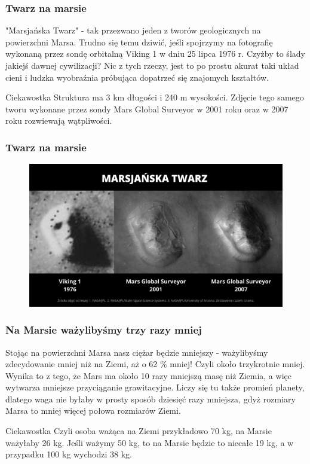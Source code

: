 \documentclass{beamer}
\begin{document}
\begin{frame}
\frametitle{Twarz na marsie}
"Marsjańska Twarz" - tak przezwano jeden z tworów geologicznych na powierzchni Marsa. Trudno się temu dziwić, jeśli spojrzymy na fotografię wykonaną przez sondę orbitalną Viking 1 w dniu 25 lipca 1976 r. Czyżby to ślady jakiejś dawnej cywilizacji? Nic z tych rzeczy, jest to po prostu akurat taki układ cieni i ludzka wyobraźnia próbująca dopatrzeć się znajomych kształtów.

 
\begin{block}{Ciekawostka}
Struktura ma 3 km długości i 240 m wysokości. Zdjęcie tego samego tworu wykonane przez sondy Mars Global Surveyor w 2001 roku oraz w 2007 roku rozwiewają wątpliwości. 
\end{block}
\end{frame}

\begin{frame}
\frametitle{Twarz na marsie}
\begin{figure}[h]
\centering
\includegraphics[width=1\textwidth]{twarz.png}
\end{figure}
\end{frame}

\begin{frame}
\frametitle{Na Marsie ważylibyśmy trzy razy mniej}
Stojąc na powierzchni Marsa nasz ciężar będzie mniejszy - ważylibyśmy zdecydowanie mniej niż na Ziemi, aż o 62 \% mniej! Czyli około trzykrotnie mniej. Wynika to z tego, że Mars ma około 10 razy mniejszą masę niż Ziemia, a więc wytwarza mniejsze przyciąganie grawitacyjne. Liczy się tu także promień planety, dlatego waga nie byłaby w prosty sposób dziesięć razy mniejsza, gdyż rozmiary Marsa to mniej więcej połowa rozmiarów Ziemi.

\begin{block}{Ciekawostka}
Czyli osoba ważąca na Ziemi przykładowo 70 kg, na Marsie ważyłaby 26 kg. Jeśli ważymy 50 kg, to na Marsie będzie to niecałe 19 kg, a w przypadku 100 kg wychodzi 38 kg.
\end{block}
\end{frame}
\end{document}
